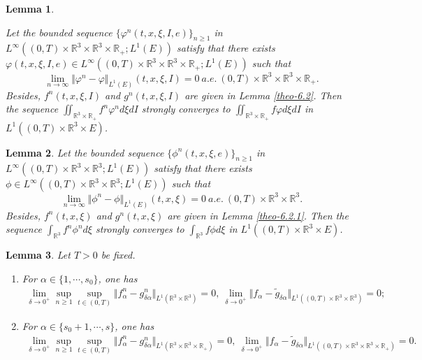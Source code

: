 \documentclass[10pt,a4paper]{amsart}
\newtheorem{lemma}{Lemma}
\def\R{\mathbb{R}}
\begin{document}
\begin{lemma}\label{theo-6.4}

Let the bounded sequence $\{ \varphi^n (t, x, \xi, I, e)\}_{n\geq 1}$ in $L^\infty ((0,T)\times \R^3 \times \R^3\times \R_+ ; L^1(E))$ satisfy that there exists $\varphi (t, x, \xi, I, e) \in L^\infty ((0,T)\times \R^3 \times \R^3 \times \R_+; L^1(E))$ such that 
\begin{equation*}
\lim \limits_{n\rightarrow \infty} \Vert \varphi^n -\varphi \Vert_{L^1(E)}(t,x,\xi,I)=0 \ a.e. \ (0,T)\times \R^3 \times \R^3\times \R_+.
\end{equation*}
Besides, $f^n (t, x, \xi, I)$ and $g^n (t, x, \xi, I)$ are given in Lemma \ref{theo-6.2}. Then the sequence $\iint_{\R^3\times \R_+} f^n\varphi^n d\xi dI$ strongly converges to $ \iint_{\R^3\times \R_+} f\varphi d\xi dI $ in $L^1((0,T)\times \R^3\times E)$.
\end{lemma}

\begin{lemma}\label{theo-6.4.1}
Let the bounded sequence $\{	\phi^n (t, x, \xi, e)\}_{n\geq 1}$ in $L^\infty ((0,T)\times \R^3 \times \R^3 ; L^1(E))$ satisfy that there exists $\phi \in L^\infty ((0,T)\times \R^3 \times \R^3 ; L^1(E))$ such that 
\begin{equation*}
	\lim \limits_{n\rightarrow \infty} \Vert \phi^n -\phi \Vert_{L^1(E)}(t,x,\xi)=0 \ a.e. \ (0,T)\times \R^3 \times \R^3.
\end{equation*}
Besides, $f^n (t, x, \xi)$ and $g^n (t, x, \xi)$ are given in Lemma \ref{theo-6.2.1}. Then the sequence $\int_{\R^3} f^n\phi^n d\xi $ strongly converges to $ \int_{\R^3 } f \phi d\xi $ in $L^1((0,T)\times \R^3\times E)$.
\end{lemma}

\begin{lemma}\label{converge f,g}
Let $T >0$ be fixed. 
\begin{enumerate}
\item {For $\alpha \in \{1,\cdots,s_0\}$, one has
	\begin{equation}\label{eq6.77}
	\begin{aligned}
	\lim \limits_{\delta \rightarrow 0^+} \sup \limits_{n\geq 1 } \sup \limits_{t\in (0,T)} \Vert f^n_\alpha -g^n_{\delta \alpha} \Vert_{L^1(\R^3 \times \R^3 )}=0, \ \lim \limits_{\delta \rightarrow 0^+} \Vert f_\alpha - \tilde{g}_{\delta \alpha} \Vert_{L^1( (0, T) \times \R^3 \times \R^3  )}=0;
	\end{aligned}
	\end{equation}}
\item{For $\alpha \in \{s_0+1,\cdots,s\}$, one has
\begin{equation}\label{eq6.76}
		\begin{aligned}
		\lim \limits_{\delta \rightarrow 0^+} \sup \limits_{n\geq 1 } \sup \limits_{t\in (0,T)} \Vert f^n_\alpha -g^n_{\delta \alpha} \Vert_{L^1(\R^3 \times \R^3\times \R_+ )}=0, \ \lim \limits_{\delta \rightarrow 0^+} \Vert f_\alpha - \tilde{g}_{\delta \alpha} \Vert_{L^1( (0, T) \times \R^3 \times \R^3\times \R_+)}=0.
	\end{aligned}
\end{equation}}
\end{enumerate}
\end{lemma}
\end{document}
